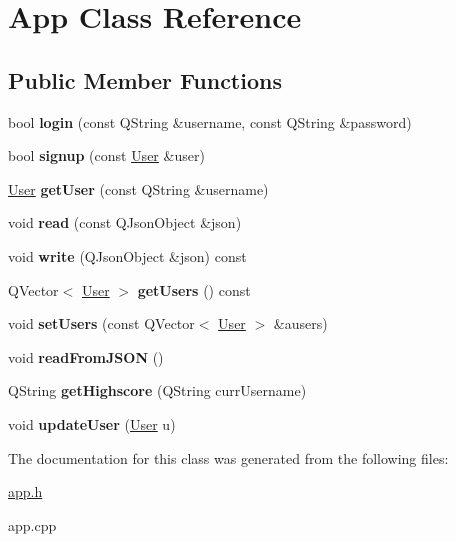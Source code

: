 \hypertarget{classApp}{}\section{App Class Reference}
\label{classApp}
\subsection*{Public Member Functions}
\begin{DoxyCompactItemize}
\item 
\mbox{\label{classApp_a616dd7985e323ee482da14df4fac580d}} 
bool {\bfseries login} (const Q\+String \&username, const Q\+String \&password)
\item 
\mbox{\label{classApp_adf640c093df78f4a0ee2503cdcc929cb}} 
bool {\bfseries signup} (const \hyperlink{classUser}{User} \&user)
\item 
\mbox{\label{classApp_a138ce8c2ba9c9f86e5e49eea5e9e8e54}} 
\hyperlink{classUser}{User} {\bfseries get\+User} (const Q\+String \&username)
\item 
\mbox{\label{classApp_adf4091f9b0e461b2bf3af29cb3f23f26}} 
void {\bfseries read} (const Q\+Json\+Object \&json)
\item 
\mbox{\label{classApp_a8c35dfa416104f7e823b2d8256f6b73b}} 
void {\bfseries write} (Q\+Json\+Object \&json) const
\item 
\mbox{\label{classApp_aa44db686178834b24a3f3e2fc58789ab}} 
Q\+Vector$<$ \hyperlink{classUser}{User} $>$ {\bfseries get\+Users} () const
\item 
\mbox{\label{classApp_a08565a4c9e4b3d4d3f015642a3f4c60b}} 
void {\bfseries set\+Users} (const Q\+Vector$<$ \hyperlink{classUser}{User} $>$ \&ausers)
\item 
\mbox{\label{classApp_ae7034d49ccaf55daf54ff0eaee77548e}} 
void {\bfseries read\+From\+J\+S\+ON} ()
\item 
\mbox{\label{classApp_a23c2abdf44ef4bd5eebb50483e8b6cd0}} 
Q\+String {\bfseries get\+Highscore} (Q\+String curr\+Username)
\item 
\mbox{\label{classApp_a56ec5fe751ee101fe9ac6f094b7e6895}} 
void {\bfseries update\+User} (\hyperlink{classUser}{User} u)
\end{DoxyCompactItemize}


The documentation for this class was generated from the following files\+:\begin{DoxyCompactItemize}
\item 
\hyperlink{app_8h}{app.\+h}\item 
app.\+cpp\end{DoxyCompactItemize}
